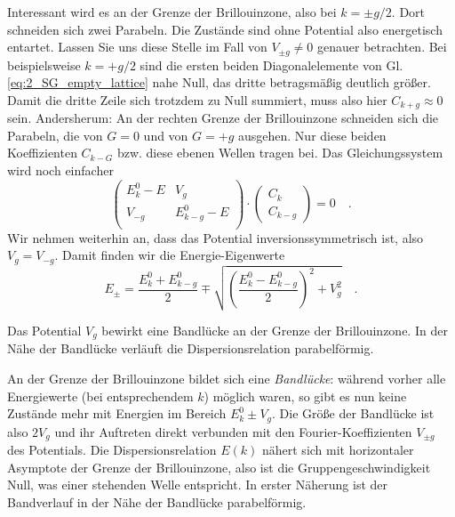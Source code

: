 Interessant wird es an der Grenze der Brillouinzone, also bei $k = \pm g/2$. Dort schneiden sich zwei Parabeln. Die Zustände sind ohne Potential also energetisch entartet. Lassen Sie uns diese Stelle im Fall von  $V_{\pm g} \neq 0$ genauer betrachten. Bei beispielsweise $k = + g/2$  sind die ersten beiden Diagonalelemente von Gl. \ref{eq:2_SG_empty_lattice} nahe Null, das dritte betragsmäßig deutlich größer. Damit die dritte Zeile sich trotzdem zu Null summiert, muss also hier $C_{k+g} \approx 0$ sein. Andersherum: An der rechten Grenze der Brillouinzone schneiden sich die Parabeln, die von $G =0$ und von $G=+g$ ausgehen. Nur diese beiden Koeffizienten $C_{k-G}$ bzw. diese ebenen Wellen tragen bei. Das Gleichungssystem wird noch einfacher 
\begin{equation}
    \begin{pmatrix}
        E_k^0 - E &  V_{g}  \\
     V_{-g}  &   E_{k - g}^0 - E   \\
 \end{pmatrix}
   \cdot
   \begin{pmatrix}
     C_{k} \\  C_{k - g} 
   \end{pmatrix}
  = 0 \quad . \label{eq:2_SG_empty_lattice_2}
 \end{equation}
Wir nehmen weiterhin an, dass das Potential inversionssymmetrisch ist, also $V_g = V_{-g}$. Damit finden wir die Energie-Eigenwerte
\begin{equation}
    E_\pm = \frac{ E_k^0 +   E_{k-g}^0}{2} \mp \sqrt{  \left( \frac{ E_k^0 -   E_{k-g}^0}{2} \right)^2 + V_g^2 }  \quad .
\end{equation}

\begin{marginfigure}
    \caption{Das Potential $V_g$ bewirkt eine Bandlücke an der Grenze der Brillouinzone. In der Nähe der Bandlücke verläuft die Dispersionsrelation parabelförmig.}
\end{marginfigure}

An der Grenze der Brillouinzone bildet sich eine \emph{Bandlücke}: während vorher alle Energiewerte (bei entsprechendem $k$) möglich waren, so gibt es nun keine Zustände mehr mit Energien  im Bereich $E_k^0   \pm  V_g$. Die Größe der Bandlücke ist also $2 V_g$ und ihr Auftreten direkt verbunden mit den Fourier-Koeffizienten $V_{\pm g}$ des Potentials.
Die Dispersionsrelation $E(k)$ nähert sich mit horizontaler Asymptote der Grenze der Brillouinzone, also ist die Gruppengeschwindigkeit Null, was einer stehenden Welle entspricht. In erster Näherung ist der Bandverlauf in der Nähe der Bandlücke parabelförmig. 


